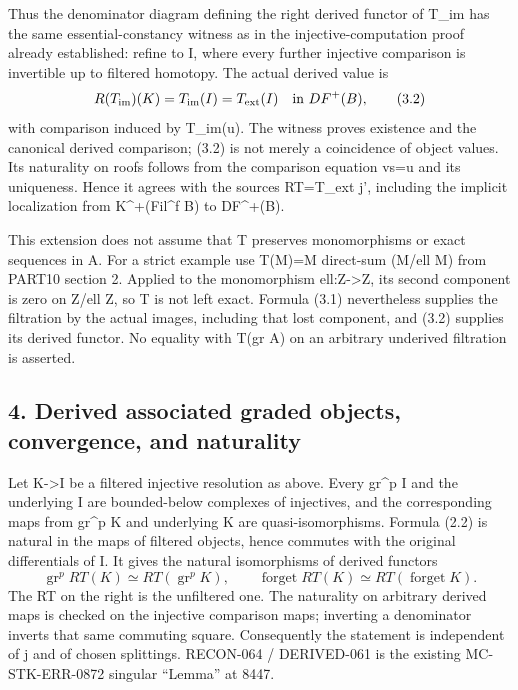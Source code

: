 \documentclass[11pt]{article}
\begin{document}
Thus the denominator diagram defining the right derived functor of T\_\allowbreak{}im has the same essential-constancy witness as in the injective-computation proof already established:\allowbreak{} refine to I,\allowbreak{} where every further injective comparison is invertible up to filtered homotopy. The actual derived value is \[
 R(T_{\rm im})(K)=T_{\rm im}(I)=T_{\rm ext}(I)
       \quad\text{in }DF^+(B),                              \tag{3.2}
\] with comparison induced by T\_\allowbreak{}im(u)\allowbreak{}. The witness proves existence and the canonical derived comparison; (3.2)\allowbreak{} is not merely a coincidence of object values. Its naturality on roofs follows from the comparison equation vs\allowbreak{}=u and its uniqueness. Hence it agrees with the source\textquotesingle s RT\allowbreak{}=T\_\allowbreak{}ext j',\allowbreak{} including the implicit localization from K\textasciicircum{}\allowbreak{}+(Fil\textasciicircum{}f B)\allowbreak{} to DF\textasciicircum{}\allowbreak{}+(B)\allowbreak{}.

This extension does not assume that T preserves monomorphisms or exact sequences in A. For a strict example use T(M)\allowbreak{}\allowbreak{}=M direct-sum (M/\allowbreak{}ell M)\allowbreak{} from PART10 section 2. Applied to the monomorphism ell:\allowbreak{}Z\allowbreak{}->Z,\allowbreak{} its second component is zero on Z/\allowbreak{}ell Z,\allowbreak{} so T is not left exact. Formula (3.1)\allowbreak{} nevertheless supplies the filtration by the actual images,\allowbreak{} including that lost component,\allowbreak{} and (3.2)\allowbreak{} supplies its derived functor. No equality with T(gr A)\allowbreak{} on an arbitrary underived filtration is asserted.

\subsection{\texorpdfstring{4. Derived associated graded objects,\allowbreak{} convergence,\allowbreak{} and naturality}{4. Derived associated graded   and naturality}}\label{proofs-8352-8772-derived-associated-graded-objects-convergence-and-naturality}

Let K\allowbreak{}->I be a filtered injective resolution as above. Every gr\^{}p I and the underlying I are bounded-below complexes of injectives,\allowbreak{} and the corresponding maps from gr\^{}p K and underlying K are quasi-isomorphisms. Formula (2.2)\allowbreak{} is natural in the maps of filtered objects,\allowbreak{} hence commutes with the original differentials of I. It gives the natural isomorphisms of derived functors \[
 \operatorname{gr}^p RT(K)\simeq RT(\operatorname{gr}^p K),
 \qquad
 \operatorname{forget}RT(K)\simeq RT(\operatorname{forget}K).
                                                               \tag{4.1}
\] The RT on the right is the unfiltered one. The naturality on arbitrary derived maps is checked on the injective comparison maps; inverting a denominator inverts that same commuting square. Consequently the statement is independent of j\textquotesingle{} and of chosen splittings. RECON-064 /\allowbreak{} DERIVED-061 is the existing MC-STK-ERR-0872 singular ``Lemma'' at 8447.
\end{document}
